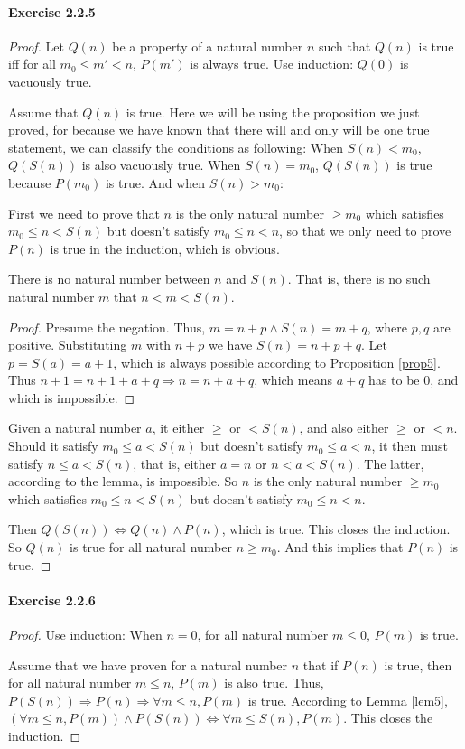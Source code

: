 \paragraph{Exercise 2.2.5} \label{exercise2.2.5}
\begin{proof}
Let $Q(n)$ be a property of a natural number $n$ such that $Q(n)$ is true iff for all $m_0\leq m'<n$, 
$P(m')$ is always true. Use induction: $Q(0)$ is vacuously true.

Assume that $Q(n)$ is true. Here we will be using the proposition we just proved, for because we have 
known that there will and only will be one true statement, we can classify the conditions as 
following: When $S(n)<m_0$, $Q(S(n))$ is also vacuously true. When $S(n)=m_0$, $Q(S(n))$ is true 
because $P(m_0)$ is true. And when $S(n)>m_0$:

First we need to prove that $n$ is the only natural number $\geq m_0$ which satisfies $m_0 \leq n<S(n)$ 
but doesn't satisfy $m_0 \leq n<n$, so that we only need to prove $P(n)$ is true in the induction, 
which is obvious.
\begin{lem}
There is no natural number between $n$ and $S(n)$. That is, there is no such natural number $m$ that 
$n<m<S(n)$. \label{lem5}
\end{lem}
\begin{proof}
Presume the negation. Thus, $m=n+p \wedge S(n)=m+q$, where $p,q$ are positive. Substituting $m$ 
with $n+p$ we have $S(n)=n+p+q$. Let $p=S(a)=a+1$, which is always possible according to Proposition 
\ref{prop5}. Thus $n+1=n+1+a+q \Longrightarrow n=n+a+q$, which means $a+q$ has to be 0, and which is 
impossible.
\end{proof}

Given a natural number $a$, it either $\geq$ or $<S(n)$, and also either $\geq$ or $<n$. Should it 
satisfy $m_0 \leq a<S(n)$ but doesn't satisfy $m_0 \leq a<n$, it then must satisfy $n \leq a<S(n)$, 
that is, either $a=n$ or $n<a<S(n)$. The latter, according to the lemma, is impossible. So $n$ is the 
only natural number $\geq m_0$ which satisfies $m_0 \leq n<S(n)$ but doesn't satisfy $m_0 \leq n<n$.

Then $Q(S(n)) \Longleftrightarrow Q(n) \wedge P(n)$, which is true. This closes the induction. So $Q(n)$ is 
true for all natural number $n \geq m_0$. And this implies that $P(n)$ is true.
\end{proof}

\paragraph{Exercise 2.2.6} \label{exercise2.2.6}
\begin{proof}
Use induction: When $n=0$, for all natural number $m\leq 0$, $P(m)$ is true.

Assume that we have proven for a natural number $n$ that if $P(n)$ is true, then for all natural number 
$m\leq n$, $P(m)$ is also true. Thus, $P(S(n)) \Longrightarrow P(n) \Longrightarrow \forall m\leq n, P(m)$
is true. According to Lemma \ref{lem5}, 
$(\forall m\leq n, P(m)) \wedge P(S(n)) \Longleftrightarrow \forall m \leq S(n), P(m)$. This closes the 
induction.
\end{proof}


